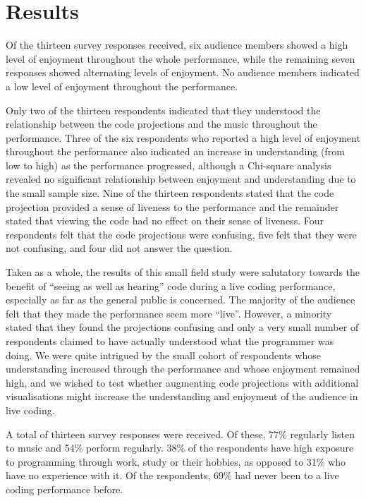 \section{Results}


Of the thirteen survey responses received, six audience members showed
a high level of enjoyment throughout the whole performance, while the
remaining seven responses showed alternating levels of enjoyment. No
audience members indicated a low level of enjoyment throughout the
performance.

Only two of the thirteen respondents indicated that they understood
the relationship between the code projections and the music throughout
the performance. Three of the six respondents who reported a high
level of enjoyment throughout the performance also indicated an
increase in understanding (from low to high) as the performance
progressed, although a Chi-square analysis revealed no significant
relationship between enjoyment and understanding due to the small
sample size. Nine of the thirteen respondents stated that the code
projection provided a sense of liveness to the performance and the
remainder stated that viewing the code had no effect on their sense of
liveness. Four respondents felt that the code projections were
confusing, five felt that they were not confusing, and four did not
answer the question.

Taken as a whole, the results of this small field study were
salutatory towards the benefit of ``seeing as well as hearing'' code
during a live coding performance, especially as far as the general
public is concerned. The majority of the audience felt that they made
the performance seem more ``live''. However, a minority stated that
they found the projections confusing and only a very small number of
respondents claimed to have actually understood what the programmer
was doing. We were quite intrigued by the small cohort of respondents
whose understanding increased through the performance and whose
enjoyment remained high, and we wished to test whether augmenting code
projections with additional visualisations might increase the
understanding and enjoyment of the audience in live coding.


A total of thirteen survey responses were received. Of these, 77\% regularly listen to music and 54\% perform regularly. 38\% of the respondents have high exposure to programming through work, study or their hobbies, as opposed to 31\% who have no experience with it. Of the respondents, 69\% had never been to a live coding performance before.

